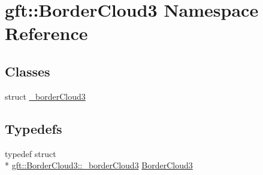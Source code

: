 \hypertarget{namespacegft_1_1BorderCloud3}{\section{gft\-:\-:Border\-Cloud3 Namespace Reference}
\label{namespacegft_1_1BorderCloud3}
}
\subsection*{Classes}
\begin{DoxyCompactItemize}
\item 
struct \hyperlink{structgft_1_1BorderCloud3_1_1__borderCloud3}{\-\_\-border\-Cloud3}
\end{DoxyCompactItemize}
\subsection*{Typedefs}
\begin{DoxyCompactItemize}
\item 
typedef struct \\*
\hyperlink{structgft_1_1BorderCloud3_1_1__borderCloud3}{gft\-::\-Border\-Cloud3\-::\-\_\-border\-Cloud3} \hyperlink{namespacegft_1_1BorderCloud3_a798c6bba07803dbc165e7b806bad3e71}{Border\-Cloud3}
\end{DoxyCompactItemize}
